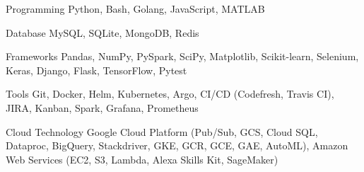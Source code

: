 

\begin{cvskills}

  \cvskill
    {Programming} %
    {Python, Bash, Golang, JavaScript, MATLAB} %

  \cvskill
    {Database} %
    {MySQL, SQLite, MongoDB, Redis} %


  \cvskill
    {Frameworks} %
    {Pandas, NumPy, PySpark, SciPy, Matplotlib, Scikit-learn, Selenium, Keras, Django, Flask, TensorFlow, Pytest} %



  \cvskill
    {Tools} %
    {Git, Docker, Helm, Kubernetes, Argo,  CI/CD (Codefresh, Travis CI), JIRA, Kanban, Spark, Grafana, Prometheus} %

  \cvskill
    {Cloud Technology} %
    {Google Cloud Platform (Pub/Sub, GCS, Cloud SQL, Dataproc, BigQuery, Stackdriver, GKE, GCR, GCE, GAE, AutoML), Amazon Web Services (EC2, S3, Lambda, Alexa Skills Kit, SageMaker)} 




\end{cvskills}
